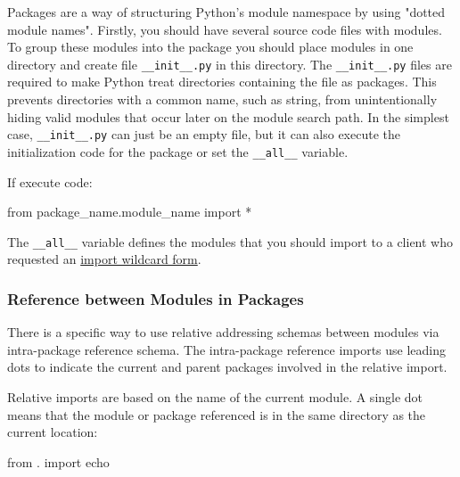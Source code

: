 \documentclass[
]{article}
\newenvironment{Shaded}{}{}
\newcommand{\ImportTok}[1]{#1}
\newcommand{\NormalTok}[1]{#1}
\newcommand{\OperatorTok}[1]{\textcolor[rgb]{0.40,0.40,0.40}{#1}}
\begin{document}
Packages are a way of structuring Python's module namespace by using
"dotted module names". Firstly, you should have several source code
files with modules. To group these modules into the package you should
place modules in one directory and create file \texttt{\_\_init\_\_.py}
in this directory. The \texttt{\_\_init\_\_.py} files are required to
make Python treat directories containing the file as packages. This
prevents directories with a common name, such as string, from
unintentionally hiding valid modules that occur later on the module
search path. In the simplest case, \texttt{\_\_init\_\_.py} can just be
an empty file, but it can also execute the initialization code for the
package or set the \texttt{\_\_all\_\_} variable.

If execute code:

\begin{Shaded}
\begin{Highlighting}[]
\ImportTok{from}\NormalTok{ package\_name.module\_name }\ImportTok{import} \OperatorTok{*}
\end{Highlighting}
\end{Shaded}

The \texttt{\_\_all\_\_} variable defines the modules that you should
import to a client who requested an
\href{https://docs.python.org/3/tutorial/modules.html?highlight=__all__\#importing-from-a-package}{import
wildcard form}.

\hypertarget{reference-between-modules-in-packages}{%
\subsubsection{Reference between Modules in
Packages}\label{reference-between-modules-in-packages}}

There is a specific way to use relative addressing schemas between
modules via intra-package reference schema. The intra-package reference
imports use leading dots to indicate the current and parent packages
involved in the relative import.

Relative imports are based on the name of the current module. A single
dot means that the module or package referenced is in the same directory
as the current location:

\begin{Shaded}
\begin{Highlighting}[]
\ImportTok{from}\NormalTok{ . }\ImportTok{import}\NormalTok{ echo         }
\end{Highlighting}
\end{Shaded}
\end{document}
